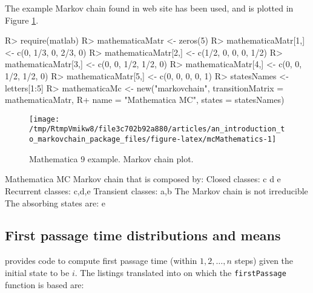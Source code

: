 \documentclass[
  nojss]{jss}
\begin{document}
The example Markov chain found in  web site \citep{mathematica9MarkovChain} has
been used, and is plotted in Figure \ref{fig:mcMathematics}.

\begin{CodeChunk}

\begin{CodeInput}
R> require(matlab)
R> mathematicaMatr <- zeros(5)
R> mathematicaMatr[1,] <- c(0, 1/3, 0, 2/3, 0)
R> mathematicaMatr[2,] <- c(1/2, 0, 0, 0, 1/2)
R> mathematicaMatr[3,] <- c(0, 0, 1/2, 1/2, 0)
R> mathematicaMatr[4,] <- c(0, 0, 1/2, 1/2, 0)
R> mathematicaMatr[5,] <- c(0, 0, 0, 0, 1)
R> statesNames <- letters[1:5]
R> mathematicaMc <- new("markovchain", transitionMatrix = mathematicaMatr,
R+                    name = "Mathematica MC", states = statesNames)
\end{CodeInput}
\end{CodeChunk}

\begin{CodeChunk}
\begin{figure}

{\centering \texttt{[image: /tmp/RtmpVmikw8/file3c702b92a880/articles/an\_introduction\_to\_markovchain\_package\_files/figure-latex/mcMathematics-1]} 

}

\caption[Mathematica 9 example]{Mathematica 9 example. Markov chain plot.}\label{fig:mcMathematics}
\end{figure}
\end{CodeChunk}

\begin{CodeChunk}

\begin{CodeOutput}
Mathematica MC  Markov chain that is composed by: 
Closed classes: 
c d 
e 
Recurrent classes: 
{c,d},{e}
Transient classes: 
{a,b}
The Markov chain is not irreducible 
The absorbing states are: e
\end{CodeOutput}
\end{CodeChunk}

\hypertarget{first-passage-time-distributions-and-means}{%
\subsection{First passage time distributions and means}\label{first-passage-time-distributions-and-means}}

\cite{renaldoMatlab} provides code to compute first passage time (within \(1,2,\ldots, n\) steps) given the initial state to be \(i\). The  listings translated into  on which the \texttt{firstPassage} function is based are:
\end{document}
